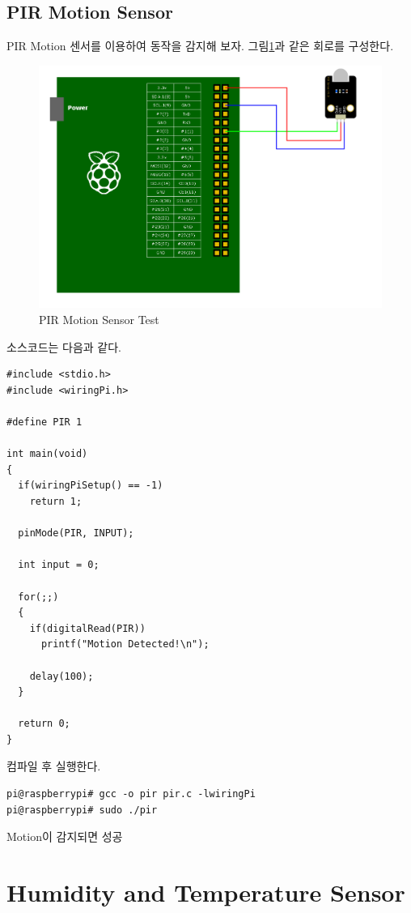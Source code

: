 \documentclass[11pt
  , a4paper
  , article
  , oneside
]{memoir}
\begin{document}
\subsection{PIR Motion Sensor}
PIR Motion 센서를 이용하여 동작을 감지해 보자. 그림\ref{fig:pir_test}과 같은 회로를 구성한다.
\begin{figure}[!htb]
\centering
\includegraphics[width=1\textwidth]{./images/raspberry/pir_test.png}
\caption{PIR Motion Sensor Test}
\label{fig:pir_test}
\end{figure}
소스코드는 다음과 같다.
\begin{lstlisting}[style=termstylenumber, caption={Editing \texttt{/etc/fai/NFSROOT}}, label={list:nfsroot-file}]
#include <stdio.h>
#include <wiringPi.h>

#define PIR 1

int main(void)
{
  if(wiringPiSetup() == -1)
    return 1;

  pinMode(PIR, INPUT);

  int input = 0;

  for(;;)
  {
    if(digitalRead(PIR))
      printf("Motion Detected!\n");

    delay(100);
  }

  return 0;
}
\end{lstlisting}
컴파일 후 실행한다.
\begin{lstlisting}[style=termstyle]
pi@raspberrypi# gcc -o pir pir.c -lwiringPi
pi@raspberrypi# sudo ./pir
\end{lstlisting}
Motion이 감지되면 성공
\section{Humidity and Temperature Sensor}
\end{document}
